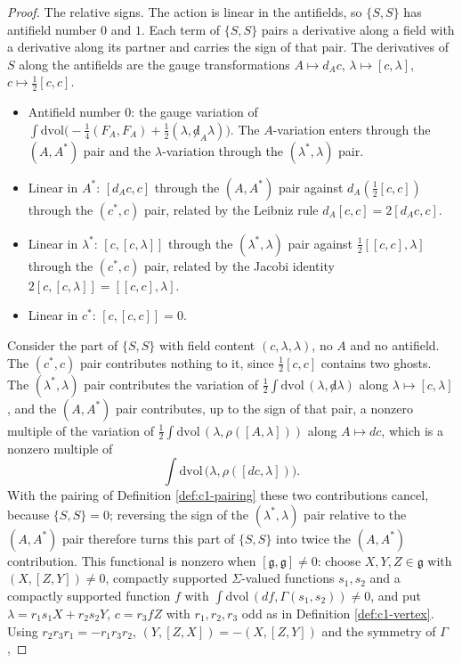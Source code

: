 \begin{proof}
The relative signs. The action is linear in the antifields, so $\{S,S\}$ has antifield number $0$ and $1$. Each term of $\{S,S\}$ pairs a derivative along a field with a derivative along its partner and carries the sign of that pair. The derivatives of $S$ along the antifields are the gauge transformations $A\mapsto d_Ac$, $\lambda\mapsto[c,\lambda]$, $c\mapsto\tfrac12[c,c]$.
\begin{itemize}
\item Antifield number $0$: the gauge variation of $\int\mathrm{dvol}\big(-\tfrac14(F_A,F_A)+\tfrac12(\lambda,{\not d}_A\lambda)\big)$. The $A$-variation enters through the $(A,A^*)$ pair and the $\lambda$-variation through the $(\lambda^*,\lambda)$ pair.
\item Linear in $A^*$: $[d_Ac,c]$ through the $(A,A^*)$ pair against $d_A(\tfrac12[c,c])$ through the $(c^*,c)$ pair, related by the Leibniz rule $d_A[c,c]=2[d_Ac,c]$.
\item Linear in $\lambda^*$: $[c,[c,\lambda]]$ through the $(\lambda^*,\lambda)$ pair against $\tfrac12[[c,c],\lambda]$ through the $(c^*,c)$ pair, related by the Jacobi identity $2[c,[c,\lambda]]=[[c,c],\lambda]$.
\item Linear in $c^*$: $[c,[c,c]]=0$.
\end{itemize}
Consider the part of $\{S,S\}$ with field content $(c,\lambda,\lambda)$, no $A$ and no antifield. The $(c^*,c)$ pair contributes nothing to it, since $\tfrac12[c,c]$ contains two ghosts. The $(\lambda^*,\lambda)$ pair contributes the variation of $\tfrac12\int\mathrm{dvol}\,(\lambda,{\not d}\lambda)$ along $\lambda\mapsto[c,\lambda]$, and the $(A,A^*)$ pair contributes, up to the sign of that pair, a nonzero multiple of the variation of $\tfrac12\int\mathrm{dvol}\,(\lambda,\rho([A,\lambda]))$ along $A\mapsto dc$, which is a nonzero multiple of
\[
\int\mathrm{dvol}\,\big(\lambda,\rho([dc,\lambda])\big).
\]
With the pairing of Definition \ref{def:c1-pairing} these two contributions cancel, because $\{S,S\}=0$; reversing the sign of the $(\lambda^*,\lambda)$ pair relative to the $(A,A^*)$ pair therefore turns this part of $\{S,S\}$ into twice the $(A,A^*)$ contribution. This functional is nonzero when $[\mathfrak g,\mathfrak g]\neq0$: choose $X,Y,Z\in\mathfrak g$ with $(X,[Z,Y])\neq0$, compactly supported $\Sigma$-valued functions $s_1,s_2$ and a compactly supported function $f$ with $\int\mathrm{dvol}\,(df,\Gamma(s_1,s_2))\neq0$, and put $\lambda=r_1s_1X+r_2s_2Y$, $c=r_3fZ$ with $r_1,r_2,r_3$ odd as in Definition \ref{def:c1-vertex}. Using $r_2r_3r_1=-r_1r_3r_2$, $(Y,[Z,X])=-(X,[Z,Y])$ and the symmetry of $\Gamma$,

\end{proof}
